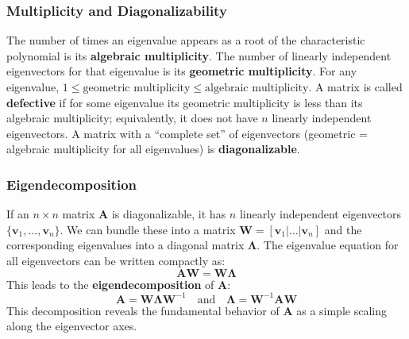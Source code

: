 \subsubsection{Multiplicity and Diagonalizability}

The number of times an eigenvalue appears as a root of the characteristic polynomial is its \textbf{algebraic multiplicity}. The number of linearly independent eigenvectors for that eigenvalue is its \textbf{geometric multiplicity}. For any eigenvalue, $1 \le \text{geometric multiplicity} \le \text{algebraic multiplicity}$. A matrix is called \textbf{defective} if for some eigenvalue its geometric multiplicity is less than its algebraic multiplicity; equivalently, it does not have \(n\) linearly independent eigenvectors. A matrix with a ``complete set'' of eigenvectors (geometric = algebraic multiplicity for all eigenvalues) is \textbf{diagonalizable}.

\subsubsection{Eigendecomposition}
If an $n \times n$ matrix $\mathbf{A}$ is diagonalizable, it has $n$ linearly independent eigenvectors $\{\mathbf{v}_1, \dots, \mathbf{v}_n\}$. We can bundle these into a matrix $\mathbf{W} = [\mathbf{v}_1 | \dots | \mathbf{v}_n]$ and the corresponding eigenvalues into a diagonal matrix $\mathbf{\Lambda}$. The eigenvalue equation for all eigenvectors can be written compactly as:
$$ \mathbf{A}\mathbf{W} = \mathbf{W}\mathbf{\Lambda} $$
This leads to the \textbf{eigendecomposition} of $\mathbf{A}$:
$$ \mathbf{A} = \mathbf{W} \mathbf{\Lambda} \mathbf{W}^{-1} \quad \text{and} \quad \mathbf{\Lambda} = \mathbf{W}^{-1} \mathbf{A} \mathbf{W} $$
This decomposition reveals the fundamental behavior of $\mathbf{A}$ as a simple scaling along the eigenvector axes.

